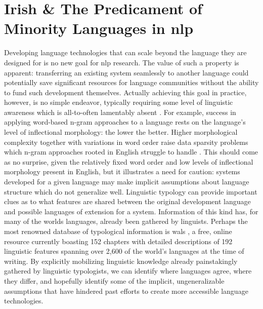 \documentclass[thesis]{cluu}
\begin{document}
\section{Irish \& The Predicament of Minority Languages in \acrfull{nlp}}\label{background:lr-lang}

Developing language technologies that can scale beyond the language they are designed for is no new goal for \gls{nlp} research. The value of such a property is apparent: transferring an existing system seamlessly to another language could potentially save significant resources for language communities without the ability to fund such development themselves. Actually achieving this goal in practice, however, is no simple endeavor, typically requiring some level of linguistic awareness which is all-to-often lamentably absent \parencite[see][inter alia]{benderAchievingEvaluatingLanguageIndependence2011,joshiStateFateLinguistic2021,hedderichSurveyRecentApproaches2021}. For example, success in applying word-based n-gram approaches to a language rests on the language's level of inflectional morphology: the lower the better. Higher morphological complexity together with variations in word order raise data sparsity problems which n-gram approaches rooted in English struggle to handle \parencite{benderAchievingEvaluatingLanguageIndependence2011}. This should come as no surprise, given the relatively fixed word order and low levels of inflectional morphology present in English, but it illustrates a need for caution: systems developed for a given language may make implicit assumptions about language structure which do not generalize well. Linguistic typology can provide important clues as to what features are shared between the original development language and possible languages of extension for a system. Information of this kind has, for many of the worlds languages, already been gathered by linguists. Perhaps the most renowned database of typological information is \gls{wals} \parencite{matthewdryerWorldAtlasLanguage2024}, a free, online resource currently boasting 152 chapters with detailed descriptions of 192 linguistic features spanning over 2,600 of the world's languages at the time of writing. By explicitly mobilizing linguistic knowledge already painstakingly gathered by linguistic typologists, we can identify where languages agree, where they differ, and hopefully identify some of the implicit, ungeneralizable assumptions that have hindered past efforts to create more accessible language technologies.
\end{document}
